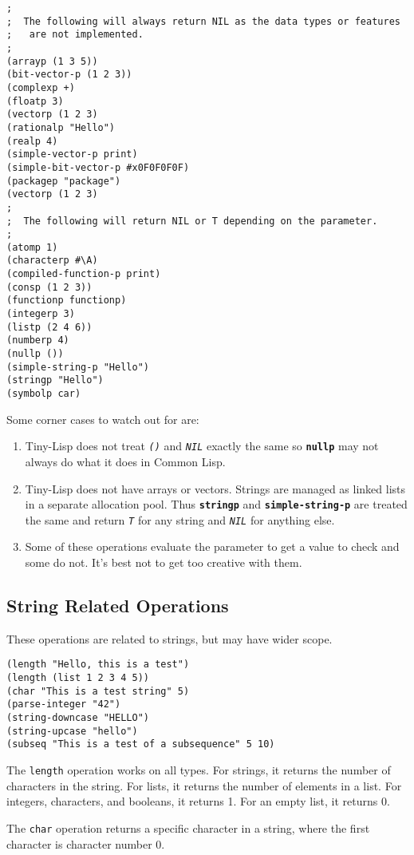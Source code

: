 \documentclass[10pt, openany]{book}
\newcommand{\operation}[1]{\textbf{\texttt{#1}}}
\newcommand{\function}[1]{\texttt{#1}}
\newcommand{\constant}[1]{\emph{\texttt{#1}}}
\newcommand{\tl}{Tiny-Lisp}
\newcommand{\cl}{Common Lisp}
\begin{document}
\begin{lstlisting}
;
;  The following will always return NIL as the data types or features
;   are not implemented.
;
(arrayp (1 3 5))
(bit-vector-p (1 2 3))
(complexp +)
(floatp 3)
(vectorp (1 2 3)
(rationalp "Hello")
(realp 4)
(simple-vector-p print)
(simple-bit-vector-p #x0F0F0F0F)
(packagep "package")
(vectorp (1 2 3)
;
;  The following will return NIL or T depending on the parameter.
;
(atomp 1)
(characterp #\A)
(compiled-function-p print)
(consp (1 2 3))
(functionp functionp)
(integerp 3)
(listp (2 4 6))
(numberp 4)
(nullp ())
(simple-string-p "Hello")
(stringp "Hello")
(symbolp car)
\end{lstlisting}

Some corner cases to watch out for are:
\begin{enumerate}
  \item \tl{} does not treat \constant{()} and \constant{NIL} exactly the same so \operation{nullp} may not always do what it does in \cl.
  \item \tl{} does not have arrays or vectors.  Strings are managed as linked lists in a separate allocation pool.  Thus \operation{stringp} and \operation{simple-string-p} are treated the same and return \constant{T} for any string and \constant{NIL} for anything else.
  \item Some of these operations evaluate the parameter to get a value to check and some do not.  It's best not to get too creative with them.
\end{enumerate}

\subsection{String Related Operations}
These operations are related to strings, but may have wider scope.
\begin{lstlisting}
(length "Hello, this is a test")
(length (list 1 2 3 4 5))
(char "This is a test string" 5)
(parse-integer "42")
(string-downcase "HELLO")
(string-upcase "hello")
(subseq "This is a test of a subsequence" 5 10)
\end{lstlisting}

The \function{length} operation works on all types.  For strings, it returns the number of characters in the string.  For lists, it returns the number of elements in a list.  For integers, characters, and booleans, it returns 1.  For an empty list, it returns 0.

The \function{char} operation returns a specific character in a string, where the first character is character number 0.
\end{document}
